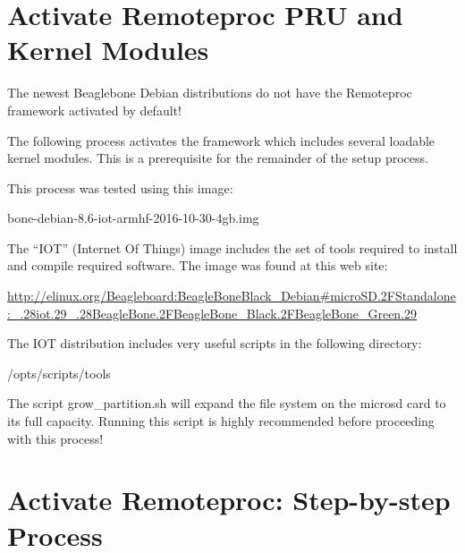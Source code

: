 \section{Activate Remoteproc PRU and Kernel Modules}

The newest Beaglebone Debian distributions do not have the Remoteproc framework activated by default!

The following process activates the framework which includes several loadable kernel modules.  This is a prerequisite for the remainder of the setup process.

This process was tested using this image:

bone-debian-8.6-iot-armhf-2016-10-30-4gb.img

The ``IOT'' (Internet Of Things) image includes the set of tools required to install and compile required software.
The image was found at this web site:

\url{http://elinux.org/Beagleboard:BeagleBoneBlack_Debian#microSD.2FStandalone:_.28iot.29_.28BeagleBone.2FBeagleBone_Black.2FBeagleBone_Green.29}

The IOT distribution includes very useful scripts in the following directory:

/opts/scripts/tools

The script grow\_partition.sh will expand the file system on the microsd card to its full capacity.  Running this script is highly recommended before proceeding with this process!

\section{Activate Remoteproc: Step-by-step Process}

